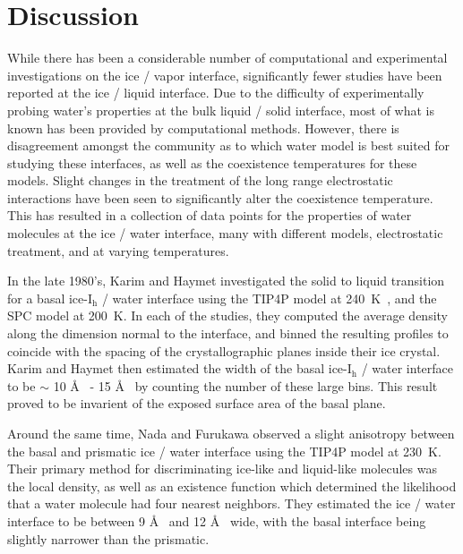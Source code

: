 \section{Discussion}
While there has been a considerable number of computational and
experimental investigations on the ice / vapor
interface\cite{Bolton2000,Conde2008,Gladich2011,Sazaki2012,Pfalzgraff2011,Watkins2011,Bartels-Rausch2014,Gladich2015,Murata2015,Asakawa2016,Benet2016,Murata2016,Neshyba2016,Limmer2016,Michaelides2017,Sanchez2017},
significantly fewer studies have been reported at the ice / liquid
interface. \cite{Beaglehole1980,Karim1988,Karim1990,Hayward2001,Hayward2002,Bryk2002,Gay2002}
Due to the difficulty of experimentally probing water's properties at
the bulk liquid / solid interface, most of what is known has been
provided by computational methods. However, there is disagreement
amongst the community as to which water model is best suited for
studying these
interfaces\cite{Sanz2004a,Vega2005c,Abascal2007,Vega2009}, as well as
the coexistence temperatures for these
models.\cite{Gao2000,Bryk2004,Sanz2004a,Vega2006a,Abascal2007,Paesani2016}
Slight changes in the treatment of the long range electrostatic
interactions have been seen to significantly alter the coexistence
temperature.\cite{Bryk2004} This has resulted in a collection of data
points for the properties of water molecules at the ice / water
interface, many with different models, electrostatic treatment, and at
varying temperatures.

In the late 1980's, Karim and Haymet investigated the solid to liquid
transition for a basal ice-I$_\mathrm{h}$ / water interface using the
TIP4P model at 240~K~\cite{Karim1987,Karim1988}, and the SPC model at
200~K.\cite{Karim1990} In each of the studies, they computed the
average density along the dimension normal to the interface, and
binned the resulting profiles to coincide with the
spacing of the crystallographic planes inside their ice crystal. Karim
and Haymet then estimated the width of the basal ice-I$_\mathrm{h}$ /
water interface to be $\sim$ 10 \AA~ - 15 \AA~ by counting the number of
these large bins. This result proved to be invarient of the exposed
surface area of the basal plane.

Around the same time, Nada and Furukawa observed a slight anisotropy
between the basal and prismatic ice / water interface using the TIP4P
model at 230~K.\cite{Nada1995} Their primary method for discriminating
ice-like and liquid-like molecules was the local density, as well as
an existence function which determined the likelihood that a water
molecule had four nearest neighbors. They estimated the ice / water
interface to be between 9 \AA~ and 12 \AA~ wide, with the basal
interface being slightly narrower than the prismatic.

